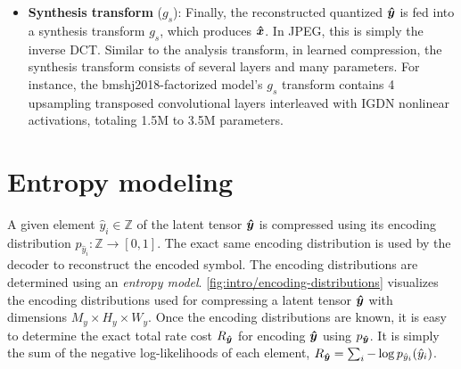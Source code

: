 \begin{itemize}
  \item \textbf{Synthesis transform} ($g_s$):
    Finally, the reconstructed quantized ${\boldsymbol{\hat{y}}}$ is fed into a synthesis transform $g_s$, which produces ${\boldsymbol{\hat{x}}}$.
    In JPEG, this is simply the inverse DCT.
    Similar to the analysis transform, in learned compression, the synthesis transform consists of several layers and many parameters.
    For instance, the bmshj2018-factorized model's $g_s$ transform contains 4 upsampling transposed convolutional layers interleaved with IGDN nonlinear activations, totaling 1.5M to 3.5M parameters.
\end{itemize}


%
%




\section{Entropy modeling}

A given element $\hat{y}_i \in \mathbb{Z}$ of the latent tensor ${\boldsymbol{\hat{y}}}$ is compressed using its encoding distribution $p_{{\hat{y}}_i} : \mathbb{Z} \to [0, 1]$.
The exact same encoding distribution is used by the decoder to reconstruct the encoded symbol.
The encoding distributions are determined using an \emph{entropy model}.
\cref{fig:intro/encoding-distributions} visualizes the encoding distributions used for compressing a latent tensor ${\boldsymbol{\hat{y}}}$ with dimensions $M_y \times H_y \times W_y$.
Once the encoding distributions are known, it is easy to determine the exact total rate cost $R_{{\boldsymbol{\hat{y}}}}$ for encoding ${\boldsymbol{\hat{y}}}$ using $p_{{\boldsymbol{\hat{y}}}}$.
It is simply the sum of the negative log-likelihoods of each element, $R_{{\boldsymbol{\hat{y}}}} = \sum_i -\log p_{{\hat{y}}_i}({\hat{y}}_i)$.


